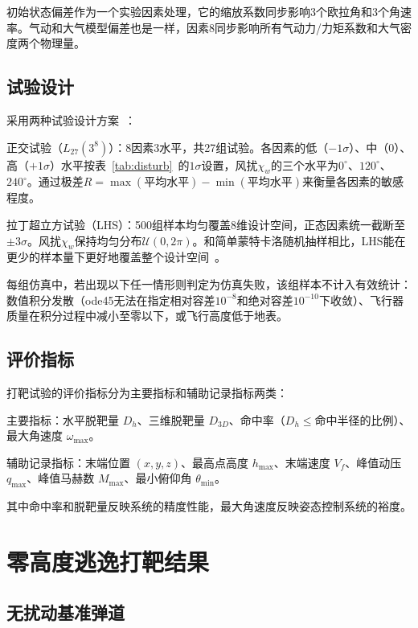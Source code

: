 初始状态偏差作为一个实验因素处理，它的缩放系数同步影响3个欧拉角和3个角速率。气动和大气模型偏差也是一样，因素8同步影响所有气动力/力矩系数和大气密度两个物理量。

\subsection{试验设计}

采用两种试验设计方案~\cite{牛得清2021,佟妮宸2022}：

正交试验（$L_{27}(3^8)$）：8因素3水平，共27组试验。各因素的低（$-1\sigma$）、中（0）、高（$+1\sigma$）水平按表~\ref{tab:disturb}~的$1\sigma$设置，风扰$\chi_w$的三个水平为$0^\circ$、$120^\circ$、$240^\circ$。通过极差$R=\max(\text{平均水平})-\min(\text{平均水平})$来衡量各因素的敏感程度。

 拉丁超立方试验（LHS）：500组样本均匀覆盖8维设计空间，正态因素统一截断至$\pm 3\sigma$。风扰$\chi_w$保持均匀分布$\mathcal{U}(0,2\pi)$。和简单蒙特卡洛随机抽样相比，LHS能在更少的样本量下更好地覆盖整个设计空间~\cite{McKay1999}。

每组仿真中，若出现以下任一情形则判定为仿真失败，该组样本不计入有效统计：数值积分发散（ode45无法在指定相对容差$10^{-8}$和绝对容差$10^{-10}$下收敛）、飞行器质量在积分过程中减小至零以下，或飞行高度低于地表。

\subsection{评价指标}

打靶试验的评价指标分为主要指标和辅助记录指标两类：

主要指标：水平脱靶量 $D_h$、三维脱靶量 $D_{3D}$、命中率（$D_h \le$命中半径的比例）、最大角速度 $\omega_{\text{max}}$。

辅助记录指标：末端位置 $(x,y,z)$、最高点高度 $h_{\text{max}}$、末端速度 $V_f$、峰值动压 $q_{\text{max}}$、峰值马赫数 $M_{\text{max}}$、最小俯仰角 $\theta_{\text{min}}$。

其中命中率和脱靶量反映系统的精度性能，最大角速度反映姿态控制系统的裕度。

\section{零高度逃逸打靶结果}

\subsection{无扰动基准弹道}

